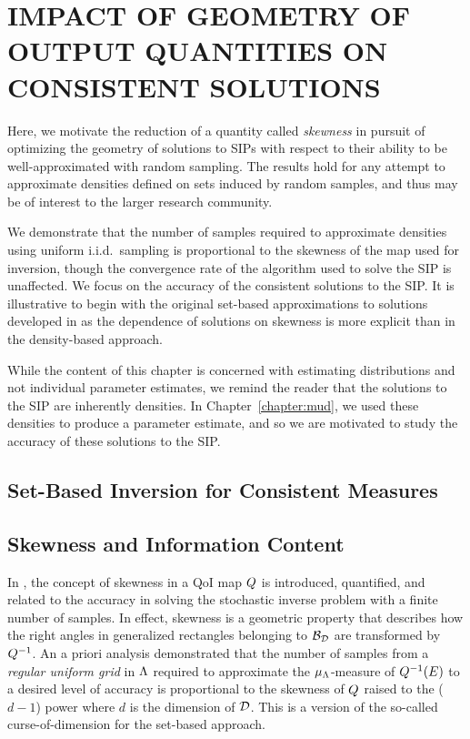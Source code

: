 \chapter{\uppercase{Impact of Geometry of Output Quantities on Consistent Solutions} \label{chapter:geometry}}

Here, we motivate the reduction of a quantity called \emph{skewness} in pursuit of optimizing the geometry of solutions to SIPs with respect to their ability to be well-approximated with random sampling.
The results hold for any attempt to approximate densities defined on sets induced by random samples, and thus may be of interest to the larger research community.

We demonstrate that the number of samples required to approximate densities using uniform i.i.d.~sampling is proportional to the skewness of the map used for inversion, though the convergence rate of the algorithm used to solve the SIP is unaffected.
We focus on the accuracy of the consistent solutions to the SIP.
It is illustrative to begin with the original set-based approximations to solutions developed in \cite{BGE+15, BET+14, MBD+15} as the dependence of solutions on skewness is more explicit than in the density-based approach.

While the content of this chapter is concerned with estimating distributions and not individual parameter estimates, we remind the reader that the solutions to the SIP are inherently densities.
In Chapter~\ref{chapter:mud}, we used these densities to produce a parameter estimate, and so we are motivated to study the accuracy of these solutions to the SIP.


\section{Set-Based Inversion for Consistent Measures}\label{sec:set-based}






\section{Skewness and Information Content}\label{sec:skewness}
In \cite{BGE+15}, the concept of skewness in a QoI map $Q$ is introduced, quantified, and related to the accuracy in solving the stochastic inverse problem with a finite number of samples.
In effect, skewness is a geometric property that describes how the right angles in generalized rectangles belonging to $\mathcal{B}_{\mathcal{D}}$ are transformed by $Q^{-1}$.
An a priori analysis demonstrated that the number of samples from a {\em regular uniform grid} in ${\Lambda}$ required to approximate the $\mu_{{\Lambda}}$-measure of $Q^{-1}(E)$ to a desired level of accuracy is proportional to the skewness of $Q$ raised to the ($d-1$) power where $d$ is the dimension of $\mathcal{D}$.
This is a version of the so-called curse-of-dimension for the set-based approach.

